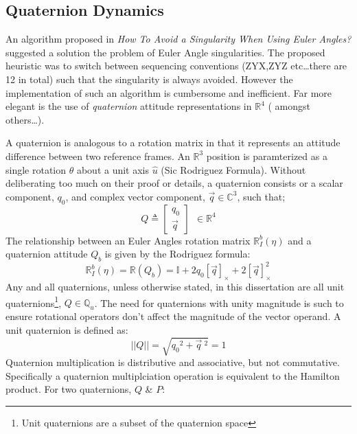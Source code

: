 \subsection{Quaternion Dynamics}
\label{subsec:dynamics.rigidbody.quaternion}
An algorithm proposed in \emph{How To Avoid a Singularity When Using Euler Angles?}\cite{euleranglesingularity} suggested a solution the problem of Euler Angle singularities. The proposed heuristic was to switch between sequencing conventions (ZYX,ZYZ etc\ldots there are 12 in total) such that the singularity is always avoided. However the implementation of such an algorithm is cumbersome and inefficient. Far more elegant is the use of \emph{quaternion} attitude representations in $\mathbb{R}^4$ (\cite{rotationsequences,quaterniondynamics,spacecraftattitutdequaternions} amongst others\ldots).
\par
A quaternion is analogous to a rotation matrix in that it represents an attitude difference between two reference frames. An $\mathbb{R}^3$ position is paramterized as a single rotation $\theta$ about a unit axis $\hat{u}$ (Sic Rodriguez Formula\cite{unwinding}). Without deliberating too much on their proof or details, a quaternion consists or a scalar component, $q_0$, and complex vector component, $\vec{q}\in \mathbb{C}^3$, such that;
\begin{equation}
Q\triangleq 
\begin{bmatrix}
q_0 \\
\vec{q}
\end{bmatrix}
~~\in\mathbb{R}^4
\end{equation}
The relationship between an Euler Angles rotation matrix $\mathbb{R}_I^b(\eta)$ and a quaternion attitude $Q_b$ is given by the Rodriguez formula:
\begin{equation}
\mathbb{R}_I^b(\eta)=\mathbb{R}(Q_b)=\mathbb{I}+2q_0[\vec{q}]_\times+2[\vec{q}]^2_\times
\end{equation}
Any and all quaternions, unless otherwise stated, in this dissertation are all unit quaternions\footnote{Unit quaternions are a subset of the quaternion space}, $Q\in\mathbb{Q}_u$. The need for quaternions with unity magnitude is such to ensure rotational operators don't affect the magnitude of the vector operand. A unit quaternion is defined as:
\begin{equation}
||Q||=\sqrt{{q_0}^2+\vec{q}~^2}=1
\end{equation}
Quaternion multiplication is distributive and associative, but not commutative. Specifically a quaternion multiplciation operation is equivalent to the Hamilton product. For two quaternions, $Q$ \& $P$:
